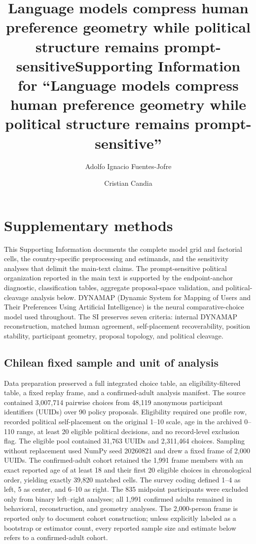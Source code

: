 \documentclass[unnumsec,webpdf,modern,large]{oup-authoring-template}
\title[Language models compress human preference geometry while political structure remains prompt-sensitive]{Language models compress human preference geometry while political structure remains prompt-sensitive}
\title[Supporting Information]{Supporting Information for ``Language models compress human preference geometry while political structure remains prompt-sensitive''}
\author[1,2,$\ast$]{Adolfo Ignacio Fuentes-Jofre}
\author[1,2,3,$\ast$]{Cristian Candia}
\begin{document}
\maketitle
\renewcommand{\thetable}{S\arabic{table}}
\renewcommand{\thefigure}{S\arabic{figure}}

\section{Supplementary methods}

This Supporting Information documents the complete model grid and factorial cells, the country-specific preprocessing and estimands, and the sensitivity analyses that delimit the main-text claims. The prompt-sensitive political organization reported in the main text is supported by the endpoint-anchor diagnostic, classification tables, aggregate proposal-space validation, and political-cleavage analysis below. DYNAMAP (Dynamic System for Mapping of Users and Their Preferences Using Artificial Intelligence) is the neural comparative-choice model used throughout. The SI preserves seven criteria: internal DYNAMAP reconstruction, matched human agreement, self-placement recoverability, position stability, participant geometry, proposal topology, and political cleavage.

\subsection{Chilean fixed sample and unit of analysis}

Data preparation preserved a full integrated choice table, an eligibility-filtered table, a fixed replay frame, and a confirmed-adult analysis manifest. The source contained 3,007,714 pairwise choices from 48,119 anonymous participant identifiers (UUIDs) over 90 policy proposals. Eligibility required one profile row, recorded political self-placement on the original 1--10 scale, age in the archived 0--110 range, at least 20 eligible political decisions, and no record-level exclusion flag. The eligible pool contained 31,763 UUIDs and 2,311,464 choices. Sampling without replacement used NumPy seed 20260821 and drew a fixed frame of 2,000 UUIDs. The confirmed-adult cohort retained the 1,991 frame members with an exact reported age of at least 18 and their first 20 eligible choices in chronological order, yielding exactly 39,820 matched cells. The survey coding defined 1--4 as left, 5 as center, and 6--10 as right. The 835 midpoint participants were excluded only from binary left--right analyses; all 1,991 confirmed adults remained in behavioral, reconstruction, and geometry analyses. The 2,000-person frame is reported only to document cohort construction; unless explicitly labeled as a bootstrap or estimator count, every reported sample size and estimate below refers to a confirmed-adult cohort.
\end{document}
